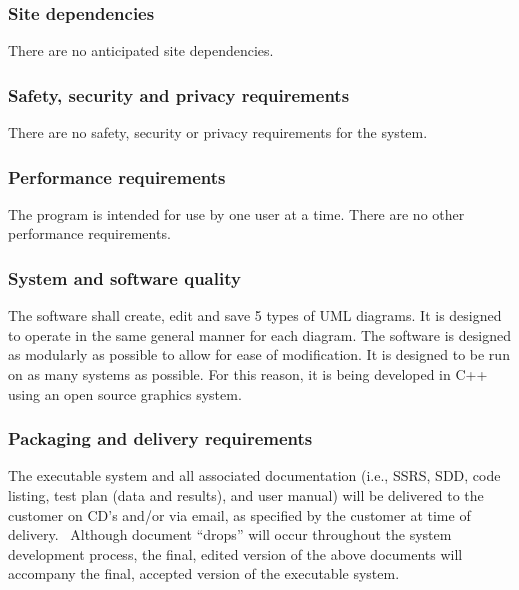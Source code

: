 \documentclass[twoside,letterpaper]{article}
\begin{document}
{\subsubsection[Site
dependencies]{\rmfamily\bfseries\color{black}
Site dependencies}

{\color{black}
There are no anticipated site dependencies.}

\subsubsection[Safety, security and privacy
requirements]{\rmfamily\bfseries\color{black}
Safety, security and privacy requirements}


{\color{black}
There are no safety, security or privacy requirements for the system.}

\subsubsection[Performance
requirements]{\rmfamily\bfseries\color{black}
Performance requirements}

{\color{black}
The program is intended for use by one user at a time.  There are no other performance requirements.}

\subsubsection[System and software
quality]{\rmfamily\bfseries\color{black} System
and software quality}


{\color{black}
The software shall create, edit and save 5 types of UML diagrams.  It is designed to operate in the same general manner for each diagram. The software is designed as modularly as possible to allow for ease of modification. It is designed to be run on as many systems as possible. For this reason, it is being developed in C++ using an open source graphics system.}

\subsubsection[Packaging and delivery
requirements]{\rmfamily\bfseries\color{black}
Packaging and delivery requirements}


{\color{black}
The executable system and all associated documentation (i.e., SSRS, SDD,
code listing, test plan (data and results), and user manual) will be
delivered to the customer on CD{\textquoteright}s and/or via email, as
specified by the customer at time of delivery. \ Although document
{\textquotedblleft}drops{\textquotedblright} will occur throughout the
system development process, the final, edited version of the above
documents will accompany the final, accepted version of the executable
system.}

}
\end{document}

